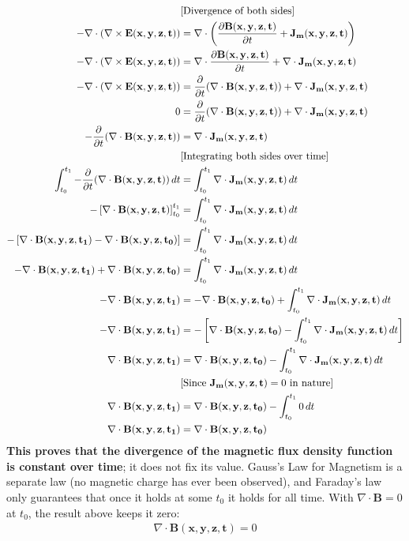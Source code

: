 \begin{align*}
  & \text{[Divergence of both sides]} \\
  -\nabla \cdot (\nabla \times \mathbf{E(x,y,z,t)}) &= \nabla \cdot \left(\frac{\partial \mathbf{B(x,y,z,t)}}{\partial t} + \mathbf{J_m(x,y,z,t)}\right) \\
  -\nabla \cdot (\nabla \times \mathbf{E(x,y,z,t)}) &= \nabla \cdot \frac{\partial \mathbf{B(x,y,z,t)}}{\partial t} + \nabla \cdot \mathbf{J_m(x,y,z,t)} \\
  -\nabla \cdot (\nabla \times \mathbf{E(x,y,z,t)}) &= \frac{\partial}{\partial t} (\nabla \cdot \mathbf{B(x,y,z,t)}) + \nabla \cdot \mathbf{J_m(x,y,z,t)} \\
  0 &= \frac{\partial}{\partial t} (\nabla \cdot \mathbf{B(x,y,z,t)}) + \nabla \cdot \mathbf{J_m(x,y,z,t)} \\
  - \frac{\partial}{\partial t} (\nabla \cdot \mathbf{B(x,y,z,t)}) &= \nabla \cdot \mathbf{J_m(x,y,z,t)} \\
  & \text{[Integrating both sides over time]} \\
  \int_{t_0}^{t_1} - \frac{\partial}{\partial t} (\nabla \cdot \mathbf{B(x,y,z,t)}) \, dt &= \int_{t_0}^{t_1} \nabla \cdot \mathbf{J_m(x,y,z,t)} \, dt \\
  - \left[\nabla \cdot \mathbf{B(x,y,z,t)}\right]_{t_0}^{t_1} &= \int_{t_0}^{t_1} \nabla \cdot \mathbf{J_m(x,y,z,t)} \, dt \\
  - \left[\nabla \cdot \mathbf{B(x,y,z,t_1)} - \nabla \cdot \mathbf{B(x,y,z,t_0)}\right] &= \int_{t_0}^{t_1} \nabla \cdot \mathbf{J_m(x,y,z,t)} \, dt \\
  - \nabla \cdot \mathbf{B(x,y,z,t_1)} + \nabla \cdot \mathbf{B(x,y,z,t_0)} &=  \int_{t_0}^{t_1} \nabla \cdot \mathbf{J_m(x,y,z,t)} \, dt \\
  - \nabla \cdot \mathbf{B(x,y,z,t_1)} &= - \nabla \cdot \mathbf{B(x,y,z,t_0)} + \int_{t_0}^{t_1} \nabla \cdot \mathbf{J_m(x,y,z,t)} \, dt \\
  - \nabla \cdot \mathbf{B(x,y,z,t_1)} &= - \left[\nabla \cdot \mathbf{B(x,y,z,t_0)} - \int_{t_0}^{t_1} \nabla \cdot \mathbf{J_m(x,y,z,t)} \, dt\right] \\
  \nabla \cdot \mathbf{B(x,y,z,t_1)} &= \nabla \cdot \mathbf{B(x,y,z,t_0)} - \int_{t_0}^{t_1} \nabla \cdot \mathbf{J_m(x,y,z,t)} \, dt \\
  & \text{[Since \( \mathbf{J_m(x,y,z,t)} = 0 \) in nature]} \\
  \nabla \cdot \mathbf{B(x,y,z,t_1)} &= \nabla \cdot \mathbf{B(x,y,z,t_0)} - \int_{t_0}^{t_1} 0 \, dt \\
  \nabla \cdot \mathbf{B(x,y,z,t_1)} &= \nabla \cdot \mathbf{B(x,y,z,t_0)}
\end{align*}
\textbf{This proves that the divergence of the magnetic flux density function
is constant over time}; it does not fix its value. Gauss's Law for Magnetism
is a separate law (no magnetic charge has ever been observed), and Faraday's
law only guarantees that once it holds at some \(t_0\) it holds for all
time. With \(\nabla \cdot \mathbf{B} = 0\) at \(t_0\), the result above keeps it zero:
\begin{align*}
  \nabla \cdot \mathbf{B(x,y,z,t)} = 0 \tag{2}
\end{align*}

